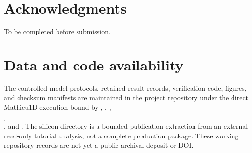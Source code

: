 \documentclass[preprint,12pt]{elsarticle}
\begin{document}
\section*{Acknowledgments}
To be completed before submission.

\section*{Data and code availability}
The controlled-model protocols, retained result records, verification code,
figures, and checksum manifests are maintained in the project repository under
the direct Mathieu1D execution bound by ,
,
,
\\
,\\
, and
. The silicon directory is a
bounded publication extraction from an external read-only tutorial analysis,
not a complete production package. These working repository records are not
yet a public archival deposit or DOI.



\end{document}

